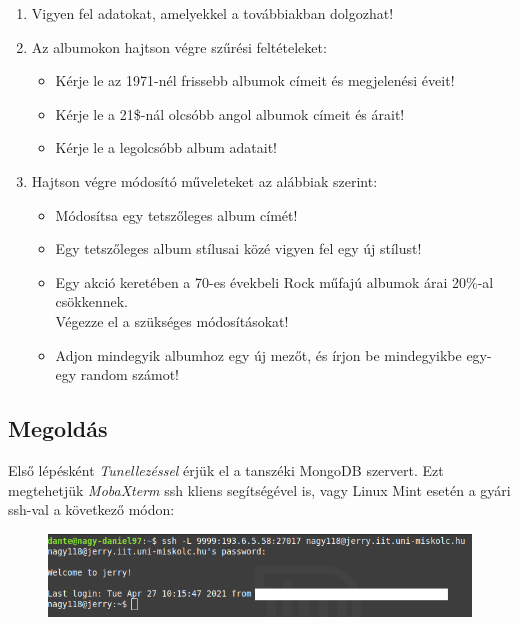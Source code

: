 \documentclass[a4paper, 12pt]{article}
\begin{document}
\begin{enumerate}[label=\textbf{\alph*)}]
\item Vigyen fel adatokat, amelyekkel a továbbiakban dolgozhat!
\item Az albumokon hajtson végre szűrési feltételeket:
	  \begin{itemize}[label=-]
	  \item Kérje le az 1971-nél frissebb albumok címeit és megjelenési éveit!
	  \item Kérje le a 21\$-nál olcsóbb angol albumok címeit és árait!
	  \item Kérje le a legolcsóbb album adatait!
	  \end{itemize}
\item Hajtson végre módosító műveleteket az alábbiak szerint:
	  \begin{itemize}[label=-]
	  \item Módosítsa egy tetszőleges album címét!
	  \item Egy tetszőleges album stílusai közé vigyen fel egy új stílust!
	  \item Egy akció keretében a 70-es évekbeli Rock műfajú albumok árai 20$\%$-al csökkennek.\\Végezze el a szükséges módosításokat!
	  \item Adjon mindegyik albumhoz egy új mezőt, és írjon be mindegyikbe egy-egy random számot!
	  \end{itemize}
\end{enumerate}
\newpage
\subsection*{Megoldás}
Első lépésként \textit{Tunellezéssel} érjük el a tanszéki MongoDB szervert. Ezt megtehetjük \textit{MobaXterm} ssh kliens segítségével is, vagy Linux Mint esetén a gyári ssh-val a következő módon:
\begin{figure}[!hb]
	\centering
	\includegraphics[scale = 0.7]{images/0_tunelling.png}
	\label{fig:0_tunelling}
\end{figure}
\end{document}
